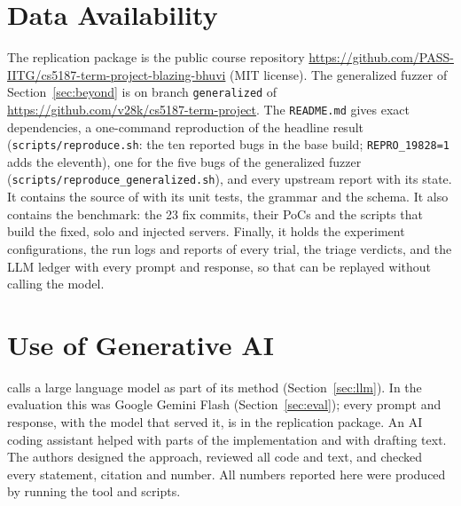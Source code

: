\section*{Data Availability}
\label{sec:data}
The replication package is the public course repository
\url{https://github.com/PASS-IITG/cs5187-term-project-blazing-bhuvi} (MIT
license). The generalized fuzzer of Section~\ref{sec:beyond} is on branch
\texttt{generalized} of \url{https://github.com/v28k/cs5187-term-project}. The \texttt{README.md} gives exact dependencies, a
one-command reproduction of the headline result (\texttt{scripts/reproduce.sh}:
the ten reported \pg bugs in the base build; \texttt{REPRO\_19828=1} adds the
eleventh), one for the five bugs of the generalized fuzzer
(\texttt{scripts/reproduce\_generalized.sh}), and every upstream report with
its state. It contains
the source of \tool with its unit tests, the grammar and the schema. It also
contains the benchmark: the 23 fix commits, their PoCs and the scripts that
build the fixed, solo and injected servers. Finally, it holds the experiment
configurations, the run logs and reports of every trial, the triage verdicts,
and the LLM ledger with every prompt and response, so that  can be
replayed without calling the model.

\section*{Use of Generative AI}
\tool calls a large language
model as part of its method (Section~\ref{sec:llm}). In the evaluation this was
Google Gemini Flash (Section~\ref{sec:eval}); every prompt and response, with
the model that served it, is in the replication package. An AI coding assistant
helped with parts of the implementation and with drafting text. The authors
designed the approach, reviewed all code and text, and checked every statement,
citation and number. All numbers reported here were produced by running the
tool and scripts.
